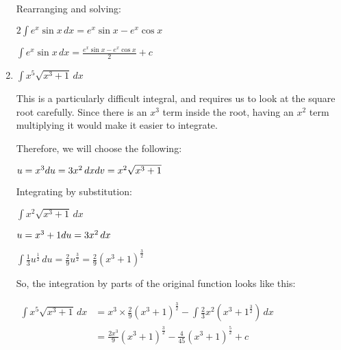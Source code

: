 \documentclass[../main.tex]{subfiles}
\begin{document}
\begin{enumerate}
    Rearranging and solving:

    \(2\int e^x \sin{x}\, dx=e^x\sin{x}-e^x\cos{x}\)

    \(\int e^x \sin{x}\, dx=\frac{e^x\sin{x}-e^x\cos{x}}{2}+c\)
    
    \item \(\int x^5 \sqrt{x^3+1}\, dx\) 
    
    This is a particularly difficult integral, and requires us to look at the square root carefully. Since there is an \(x^3\) term inside the root, having an \(x^2\) term multiplying it would make it easier to integrate.
    
    Therefore, we will choose the following:

    \(u=x^3\\
    du=3x^2\,dx\\
    dv=x^2\sqrt{x^3+1}\)

    Integrating by substitution:

    \(\int x^2 \sqrt{x^3+1}\, dx\) 

    \(u=x^3+1\\
    du=3x^2\,dx\)

    \(\int \frac{1}{3}u^{\frac{1}{2}}\,du=\frac{2}{9}u^{\frac{3}{2}}=\frac{2}{9}(x^3+1)^{\frac{3}{2}}\)

    So, the integration by parts of the original function looks like this:
    
    $
    \!
    \begin{aligned}
        \int x^5 \sqrt{x^3+1}\, dx
        &=x^3\times \frac{2}{9}(x^3+1)^{\frac{3}{2}}-\int \frac{2}{3}x^2(x^3+1^{\frac{3}{2}})\,dx\\
        &=\frac{2x^3}{9}(x^3+1)^{\frac{3}{2}}-\frac{4}{45}(x^3+1)^{\frac{5}{2}}+c
    \end{aligned}$

    
\end{enumerate}
\end{document}
